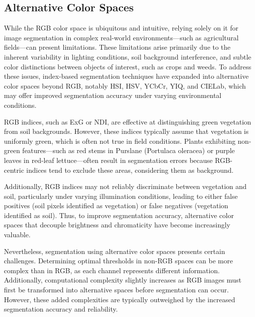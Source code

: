 \documentclass[letterpaper]{report}
\begin{document}
{\subsection{Alternative Color Spaces}
While the RGB color space is ubiquitous and intuitive, relying solely on it for image segmentation in complex real-world environments—such as agricultural fields—can present limitations. These limitations arise primarily due to the inherent variability in lighting conditions, soil background interference, and subtle color distinctions between objects of interest, such as crops and weeds. To address these issues, index-based segmentation techniques have expanded into alternative color spaces beyond RGB, notably \gls{HSI}, \gls{HSV}, YCbCr, YIQ, and CIELab, which may offer improved segmentation accuracy under varying environmental conditions.

RGB indices, such as \gls{ExG} or \gls{NDI}, are effective at distinguishing green vegetation from soil backgrounds. However, these indices typically assume that vegetation is uniformly green, which is often not true in field conditions. Plants exhibiting non-green features—such as red stems in Purslane (Portulaca oleracea) or purple leaves in red-leaf lettuce—often result in segmentation errors because RGB-centric indices tend to exclude these areas, considering them as background.

Additionally, RGB indices may not reliably discriminate between vegetation and soil, particularly under varying illumination conditions, leading to either false positives (soil pixels identified as vegetation) or false negatives (vegetation identified as soil). Thus, to improve segmentation accuracy, alternative color spaces that decouple brightness and chromaticity have become increasingly valuable.

Nevertheless, segmentation using alternative color spaces presents certain challenges. Determining optimal thresholds in non-RGB spaces can be more complex than in RGB, as each channel represents different information. Additionally, computational complexity slightly increases as RGB images must first be transformed into alternative spaces before segmentation can occur. However, these added complexities are typically outweighed by the increased segmentation accuracy and reliability.

}
\end{document}
